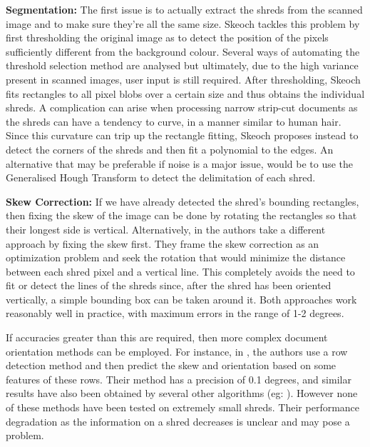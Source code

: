 \textbf{Segmentation:} The first issue is to actually extract the shreds from the scanned image and to make sure they're all the same size. Skeoch \cite{P26} tackles this problem by first thresholding the original image as to detect the position of the pixels sufficiently different from the background colour. Several ways of automating the threshold selection method are analysed but ultimately, due to the high variance present in scanned images, user input is still required. After thresholding, Skeoch fits rectangles to all pixel blobs over a certain size and thus obtains the individual shreds. A complication can arise when processing narrow strip-cut documents as the shreds can have a tendency to curve, in a manner similar to human hair. Since this curvature can trip up the rectangle fitting, Skeoch proposes instead to detect the corners of the shreds and then fit a polynomial to the edges. An alternative that may be preferable if noise is a major issue, would be to use the Generalised Hough Transform \cite{P44} to detect the delimitation of each shred.

\textbf{Skew Correction:} If we have already detected the shred's bounding rectangles, then fixing the skew of the image can be done by rotating the rectangles so that their longest side is vertical. Alternatively, in \cite{P34} the authors take a different approach by fixing the skew first. They frame the skew correction as an optimization problem and seek the rotation that would minimize the distance between each shred pixel and a vertical line. This completely avoids the need to fit or detect the lines of the shreds since, after the shred has been oriented vertically, a simple bounding box can be taken around it. Both approaches work reasonably well in practice, with maximum errors in the range of 1-2 degrees.

If accuracies greater than this are required, then more complex document orientation methods can be employed. For instance, in \cite{P41}, the authors use a row detection method and then predict the skew and orientation based on some features of these rows. Their method has a precision of 0.1 degrees, and similar results have also been obtained by several other algorithms (eg: \cite{P42,P43}). However none of these methods have been tested on extremely small shreds. Their performance degradation as the information on a shred decreases is unclear and may pose a problem.

